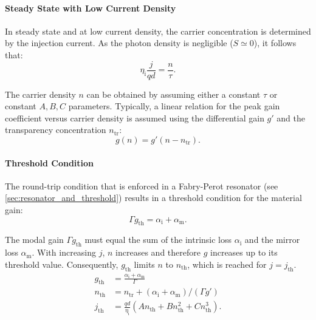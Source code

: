 \paragraph{Steady State with Low Current Density}

In steady state and at low current density, the carrier concentration is determined
by the injection current. As the photon density is negligible ($S \simeq 0$), it follows
that:
\begin{equation}
	\eta_{\mathrm{i}}\frac{j}{qd}=\frac{n}{\tau}.
\end{equation}

The carrier density $n$ can be obtained by assuming either a constant $\tau$ or
constant $A, B, C$ parameters. Typically, a linear relation for the peak gain
coefficient versus carrier density is assumed using the differential gain $g'$
and the transparency concentration $n_{\mathrm{tr}}$:
\begin{equation}
	g(n)=g' (n-n_{\mathrm{tr}}).
\end{equation}

\paragraph{Threshold Condition}

The round-trip condition that is enforced in a Fabry-Perot resonator (see \cref{sec:resonator_and_threshold}) results in
a threshold condition for the material gain:
\begin{equation}
	\Gamma g_{\mathrm{th}}=\alpha_{\mathrm{i}}+\alpha_{\mathrm{m}}.
\end{equation}

The modal gain $\Gamma
g_{\mathrm{th}}$ must equal the sum of the intrinsic loss $\alpha_{\mathrm{i}}$ and
the mirror loss $\alpha_{\mathrm{m}}$. With increasing $j$, $n$ increases and therefore
$g$ increases up to its threshold value. Consequently, $g_{\mathrm{th}}$ limits $n$
to $n_{\mathrm{th}}$, which is reached for $j=j_{\mathrm{th}}$.
\begin{align}
	g_{\mathrm{th}} & =\frac{\alpha_{\mathrm{i}}+\alpha_{\mathrm{m}}}{\Gamma}                                   \\
	n_{\mathrm{th}} & =n_{\mathrm{tr}}+(\alpha_{\mathrm{i}}+\alpha_{\mathrm{m}}) /(\Gamma g')                   \\
	j_{\mathrm{th}} & =\frac{qd}{\eta_{\mathrm{i}}}(An_{\mathrm{th}}+Bn_{\mathrm{th}}^{2}+Cn_{\mathrm{th}}^{3}). \label{eq:j_th}
\end{align}


